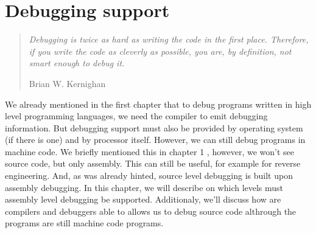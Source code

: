\chapter{Debugging support}

\begin{quote}
  \textit{Debugging is twice as hard as writing the code in the first place. Therefore, if you write the code as cleverly as possible, you are, by definition, not smart enough to debug it.}\begin{flushright}
    \tiny{Brian W. Kernighan}
  \end{flushright}
\end{quote}

We already mentioned in the first chapter that to debug programs written in
high level programming languages, we need the compiler to emit debugging
information. But debugging support must also be provided by operating system
(if there is one) and by processor itself. However, we can still debug programs
in machine code. We briefly mentioned this in chapter 1 , however, we
won't see source code, but only assembly. This can still be useful, for example
for reverse engineering. And, as was already hinted, source level debugging is
built upon assembly debugging. In this chapter, we will describe on which
levels must assembly level debugging be supported. Additionaly, we'll discuss
how are compilers and debuggers able to allows us to debug source code
althrough the programs are still machine code programs. 

